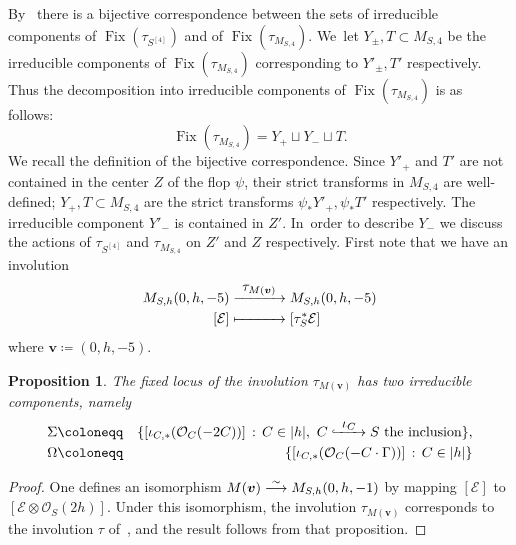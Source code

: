 \documentclass[JEP,XML,SOM,Unicode,published]{cedram}
\newcommand\To[1]{\mathchoice{\xrightarrow{\textstyle\kern4pt#1\kern3pt}}{\stackrel{#1}{\longrightarrow}}{}{}}
\newcommand\Hto[1]{\mathrel{\lhook\joinrel\To{#1}}}
\newcommand\Mto[1]{\mathrel{\mapstochar\To{#1}}}
\newcommand\cE{\mathcal{E}}
\newcommand\cO{\mathcal{O}}
\newcommand\vv{\ensuremath{\boldsymbol v}}
\DeclareMathOperator{\Fix}{Fix}
\newtheorem{prop}[lemm]{Proposition}
\theoremstyle{definition}
\begin{document}
By~\cite[\S 5.1]{involutions1} there is a bijective correspondence between the sets of irreducible components of $\Fix(\tau_{S^{[4]}})$ and of $\Fix(\tau_{M_{S,4}})$. We~let $Y_{\pm},T\subset M_{S,4}$ be the irreducible components of $\Fix(\tau_{M_{S,4}})$ corresponding to
$Y'_{\pm},T'$ respectively.
Thus the decomposition into irreducible components of $\Fix(\tau_{M_{S,4}})$ is as follows:
\begin{equation*}
\Fix(\tau_{M_{S,4}})=Y_+\sqcup Y_-\sqcup T.
\end{equation*}
We recall the definition of the bijective correspondence. Since $Y'_{+}$ and $T'$ are not contained in the center $Z$ of the flop $\psi$, their strict transforms in $M_{S,4}$ are well-defined;
$Y_{+},T\subset M_{S,4}$ are the strict transforms $\psi_*Y'_{+},\psi_*T'$ respectively. The irreducible component $Y'_{-}$ is contained in $Z'$. In~order to describe $Y_{-}$ we discuss the actions of $\tau_{S^{[4]}}$ and $\tau_{M_{S,4}}$ on $Z'$ and $Z$ respectively. First note that we have an involution
\begin{equation*}\label{azionequattro}
\begin{aligned}
M_{S,h}(0,h,-5) & \To{\tau_{M(\vv)}} M_{S,h}(0,h,-5) \\
[\cE] & \Mto{\hphantom{\tau_{M(\vv)}}} [\tau_S^{*}\cE]
\end{aligned}
\end{equation*}
where $\vv\coloneqq (0,h,-5)$.

\begin{prop}\label{prop:fissidimdue}
The fixed locus of the involution $\tau_{M(\vv)}$ has two irreducible components, namely
\begin{eqnarray*}
\Sigma & \coloneqq & \{[\iota_{C,*}(\cO_C(-2C))]\,:\, C\in|h|,\
\text{$C\Hto{\iota_{C}} S$ the inclusion}\}, \\
\Omega & \coloneqq & \{[\iota_{C,*}(\cO_C(-C\cdot\Gamma))]\,:\, C\in|h|\}
\end{eqnarray*}
\end{prop}

\begin{proof}
One defines an isomorphism $M(\vv)\To{\sim} M_{S,h}(0,h,-1)$ by mapping $[\cE]$ to $[\cE\otimes\cO_S(2h)]$. Under this isomorphism, the involution $\tau_{M(\vv)}$ corresponds to the involution
$\tau$ of~\cite[Prop.\,4.1]{involutions1}, and the result follows from that proposition.
\end{proof}
\end{document}
